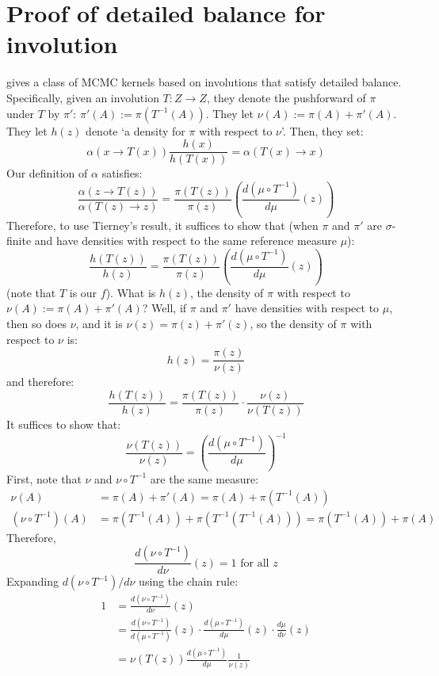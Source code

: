 \documentclass[twoside]{article}
\begin{document}
\section{Proof of detailed balance for involution}
\citet{tierney1998note} gives a class of MCMC kernels based on involutions that satisfy detailed balance.
Specifically, given an involution $T : Z \to Z$, they denote the pushforward of $\pi$ under $T$ by $\pi'$:
$\pi'(A) := \pi(T^{-1}(A))$.
They let $\nu(A) := \pi(A) + \pi'(A)$.
They let $h(z)$ denote `a density for $\pi$ with respect to $\nu$'.
Then, they set:
\[
\alpha(x \to T(x)) \frac{h(x)}{h(T(x))} = \alpha(T(x) \to x)
\]
Our definition of $\alpha$ satisfies:
\[
\frac{\alpha(z \to T(z))}{\alpha(T(z) \to z)} = \frac{\pi(T(z))}{\pi(z)} \left( \frac{d (\mu \circ T^{-1})}{d \mu} (z) \right)
\]
Therefore, to use Tierney's result, it suffices to show that (when $\pi$ and $\pi'$ are $\sigma$-finite and have densities with respect to the same reference measure $\mu$):
\[
\frac{h(T(z))}{h(z)}= \frac{\pi(T(z))}{\pi(z)} \left( \frac{d (\mu \circ T^{-1})}{d \mu} (z) \right)
\]
(note that $T$ is our $f$).
What is $h(z)$, the density of $\pi$ with respect to $\nu(A) := \pi(A) + \pi'(A)$?
Well, if $\pi$ and $\pi'$ have densities with respect to $\mu$, then so does $\nu$, and it is $\nu(z) = \pi(z) + \pi'(z)$, so the density of $\pi$ with respect to $\nu$ is:
\[
h(z) = \frac{\pi(z)}{\nu(z)} %
\]
and therefore:
\[
\frac{h(T(z))}{h(z)} = \frac{\pi(T(z))}{\pi(z)} \cdot \frac{\nu(z)}{\nu(T(z))}
\]
It suffices to show that:
\[
\frac{\nu(T(z))}{\nu(z)} = \left( \frac{d (\mu \circ T^{-1})}{d \mu} \right)^{-1}
\]
First, note that $\nu$ and $\nu \circ T^{-1}$ are the same measure:
\begin{align}
\nu(A) &= \pi(A) + \pi'(A) = \pi(A) + \pi(T^{-1}(A))\\
(\nu \circ T^{-1})(A) &= \pi(T^{-1}(A)) + \pi(T^{-1}(T^{-1}(A))) = \pi(T^{-1}(A)) + \pi(A)
\end{align}
Therefore,
\[
\frac{d (\nu \circ T^{-1})}{d \nu}(z) = 1 \mbox{ for all } z
\]
Expanding $d(\nu \circ T^{-1}) / d \nu$ using the chain rule:
\begin{align}
1 &= \frac{d (\nu \circ T^{-1})}{d \nu}(z)\\
&=   \frac{d (\nu \circ T^{-1})}{d (\mu \circ T^{-1})}(z) \cdot
    \frac{d (\mu \circ T^{-1})}{d \mu}(z) \cdot
    \frac{d \mu}{d \nu}(z)\\
&= \nu(T(z))  \frac{d (\mu \circ T^{-1})}{d \mu} \frac{1}{\nu(z)}
\end{align}
\end{document}
